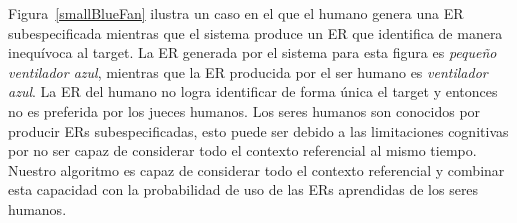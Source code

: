 \begin{table}[H]
Figura~\ref{smallBlueFan} ilustra un caso en el que el humano genera una ER subespecificada mientras que el sistema produce un ER que identifica de manera inequ\'{i}voca al target. La ER generada por el sistema para esta figura es {\it peque\~no ventilador azul}, mientras que la ER producida por el ser humano es {\it ventilador azul}. La ER del humano no logra identificar de forma \'unica el target y entonces no es preferida por los jueces humanos. Los seres humanos son conocidos por producir ERs subespecificadas, esto puede ser debido a las limitaciones cognitivas por no ser capaz de considerar todo el contexto referencial al mismo tiempo. Nuestro algoritmo es capaz de considerar todo el contexto referencial y combinar esta capacidad con la probabilidad de uso de las ERs aprendidas de los seres humanos.





\end{table}

